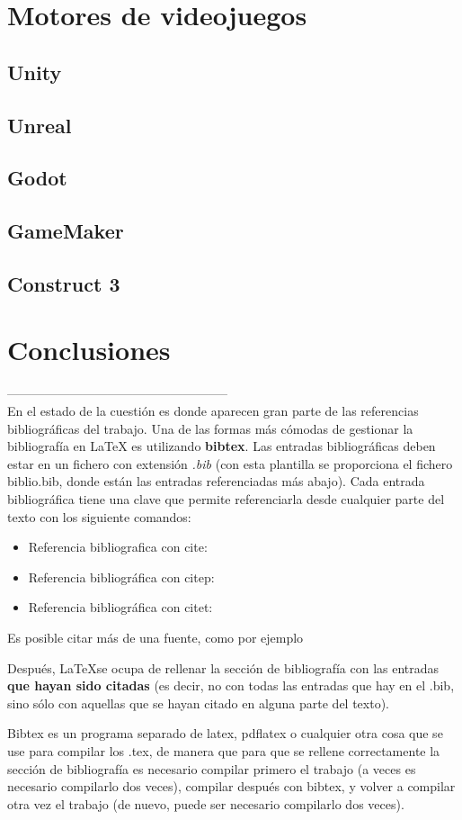 \section{Motores de videojuegos}
\subsection{Unity}
\subsection{Unreal}
\subsection{Godot}
\subsection{GameMaker}
\subsection{Construct 3}
\section{Conclusiones}
-----------------------------------------------------\\
En el estado de la cuestión es donde aparecen gran parte de las referencias bibliográficas del trabajo. Una de las formas más cómodas de gestionar la bibliografía en {\LaTeX} es utilizando \textbf{bibtex}. Las entradas bibliográficas deben estar en un fichero con extensión \textit{.bib} (con esta plantilla se proporciona el fichero biblio.bib, donde están las entradas referenciadas más abajo). Cada entrada bibliográfica tiene una clave que permite referenciarla desde cualquier parte del texto con los siguiente comandos:

\begin{itemize}
\item Referencia bibliografica con cite: \cite{ldesc2e}
\item Referencia bibliográfica con citep: \citep{notsoshort}
\item Referencia bibliográfica con citet: \citet{latexAPrimer}
\end{itemize}

Es posible citar más de una fuente, como por ejemplo \citep{latexCompanion,LaTeXLamport,texKnuth}

Después, \LaTeX se ocupa de rellenar la sección de bibliografía con las entradas \textbf{que hayan sido citadas} (es decir, no con todas las entradas que hay en el .bib, sino sólo con aquellas que se hayan citado en alguna parte del texto).

Bibtex es un programa separado de latex, pdflatex o cualquier otra cosa que se use para compilar los .tex, de manera que para que se rellene correctamente la sección de bibliografía es necesario compilar primero el trabajo (a veces es necesario compilarlo dos veces), compilar después con bibtex, y volver a compilar otra vez el trabajo (de nuevo, puede ser necesario compilarlo dos veces). 
